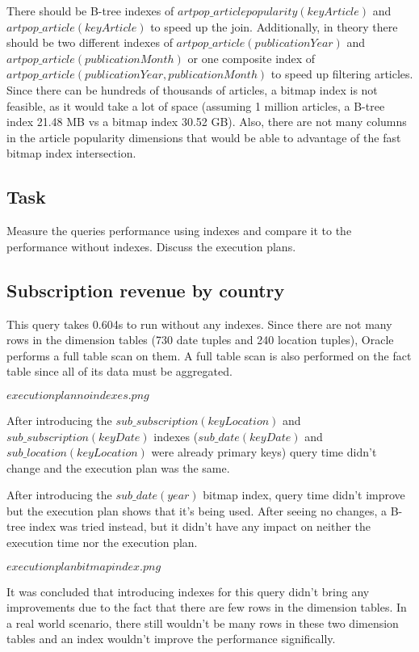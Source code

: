 There should be B-tree indexes of $artpop\_articlepopularity(keyArticle)$ and $artpop\_article(keyArticle)$ to speed up the join. Additionally, in theory there should be two different indexes of $artpop\_article(publicationYear)$ and $artpop\_article(publicationMonth)$ or one composite index of $artpop\_article(publicationYear, publicationMonth)$ to speed up filtering articles. Since there can be hundreds of thousands of articles, a bitmap index is not feasible, as it would take a lot of space (assuming 1 million articles, a B-tree index 21.48 MB vs a bitmap index 30.52 GB). Also, there are not many columns in the article popularity dimensions that would be able to advantage of the fast bitmap index intersection.

\subsection*{Task} 
Measure the queries performance using indexes and compare it to the
performance without indexes. Discuss the execution plans.

\subsection*{Subscription revenue by country} 
This query takes 0.604s to run without any indexes. Since there are not many rows in the dimension tables (730 date tuples and 240 location tuples), Oracle performs a full table scan on them. A full table scan is also performed on the fact table since all of its data must be aggregated.

$execution plan no indexes.png$

After introducing the $sub\_subscription(keyLocation)$ and $sub\_subscription(keyDate)$ indexes ($sub\_date(keyDate)$ and $sub\_location(keyLocation)$ were already primary keys) query time didn't change and the execution plan was the same.

After introducing the $sub\_date(year)$ bitmap index, query time didn't improve but the execution plan shows that it's being used. After seeing no changes, a B-tree index was tried instead, but it didn't have any impact on neither the execution time nor the execution plan.

$execution plan bitmap index.png$

It was concluded that introducing indexes for this query didn't bring any improvements due to the fact that there are few rows in the dimension tables. In a real world scenario, there still wouldn't be many rows in these two dimension tables and an index wouldn't improve the performance significally.

